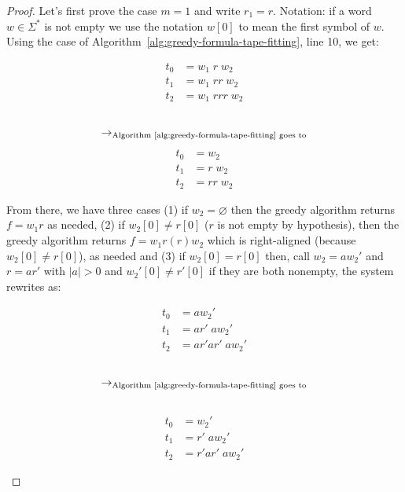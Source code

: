 \begin{proof}
    Let's first prove the case $m=1$ and write $r_1 = r$.
    Notation: if a word $w\in\Sigma^*$ is not empty we use the notation $w[0]$ to mean the first symbol of $w$. Using the case of Algorithm~\ref{alg:greedy-formula-tape-fitting}, line 10, we get:
    \setlength{\columnsep}{-7.5cm}
    \begin{multicols}{3}
        \noindent
        \begin{align*}
            t_0 & = w_1\; r\;  w_2     \\
            t_1 & = w_1\; rr\;  w_2    \\
            t_2 & = w_1\; r r r\;  w_2
        \end{align*}
        \begin{align*}
             & \\
            \to_{\text{Algorithm~\ref{alg:greedy-formula-tape-fitting} goes to}}
        \end{align*}
        \begin{align*}
            t_0 & = w_2        \\
            t_1 & = r\;  w_2   \\
            t_2 & = r r\;  w_2
        \end{align*}
    \end{multicols}
    From there, we have three cases (1) if $w_2 = \varnothing$ then the greedy algorithm returns $f = w_1 r$ as needed, (2) if $w_2[0] \neq r[0]$ ($r$ is not empty by hypothesis), then the greedy algorithm returns $f = w_1 r (r) w_2$ which is right-aligned (because $w_2[0] \neq r[0]$), as needed and (3) if $w_2[0] = r[0]$ then, call $w_2 = a w_2'$ and $r = ar'$ with $|a| > 0$ and  $w_2'[0] \neq r'[0]$ if they are both nonempty, the system rewrites as:

    \setlength{\columnsep}{-7.5cm}
    \begin{multicols}{3}
        \noindent
        \begin{align*}
            t_0 & = a w_2'            \\
            t_1 & = ar'\;  a w_2'     \\
            t_2 & = ar' ar'\;  a w_2'
        \end{align*}
        \begin{align*}
             &                                                                   \\
            \to_{\text{Algorithm~\ref{alg:greedy-formula-tape-fitting} goes to}} \\
             &
        \end{align*}
        \begin{align*}
            t_0 & = w_2'             \\
            t_1 & = r'\;  a w_2'     \\
            t_2 & = r' ar'\;  a w_2'
        \end{align*}
    \end{multicols}




\end{proof}
